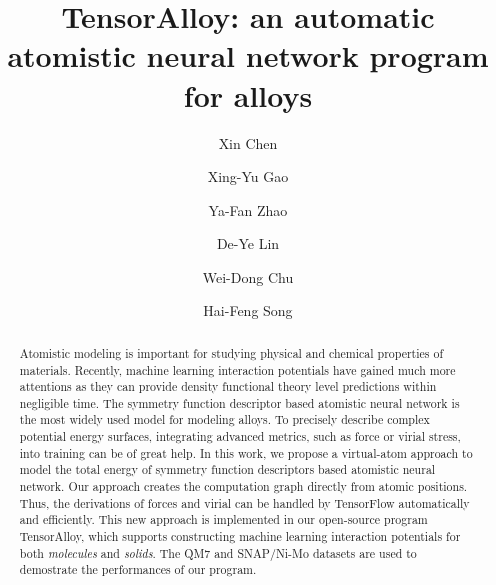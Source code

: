 \documentclass[final,1p,times]{elsarticle}
\begin{document}
\begin{frontmatter}



\title{TensorAlloy: an automatic atomistic neural network program for alloys}


\author[a]{Xin Chen}
\author[a]{Xing-Yu Gao}
\author[b]{Ya-Fan Zhao}
\author[b]{De-Ye Lin}
\author[a]{Wei-Dong Chu}
\author[a,b]{Hai-Feng Song}

\address[a]{Institute of Applied Physics and Computational Mathematics, 
Beijing 100088, China}
\address[b]{CAEP Software Center for High Performance Numerical Simulation, 
Beijing 100088, China}

\begin{abstract}
Atomistic modeling is important for studying physical and chemical properties of
materials. Recently, machine learning interaction potentials have gained much 
more attentions as they can provide density functional theory level predictions 
within negligible time. The symmetry function descriptor based 
atomistic neural network is the most widely used model for modeling alloys. 
To precisely describe complex potential energy surfaces, integrating advanced 
metrics, such as force or virial stress, into training can be of great help.  
In this work, we propose a virtual-atom approach to model the total energy of 
symmetry function descriptors based atomistic neural network. Our approach 
creates the computation graph directly from atomic positions. Thus, the 
derivations of forces and virial can be handled by TensorFlow automatically and 
efficiently. This new approach is implemented in our open-source program 
TensorAlloy, which supports constructing machine learning interaction potentials 
for both \textit{molecules} and \textit{solids}. The QM7 and SNAP/Ni-Mo datasets 
are used to demostrate the performances of our program.
\end{abstract}


\end{frontmatter}
\end{document}
